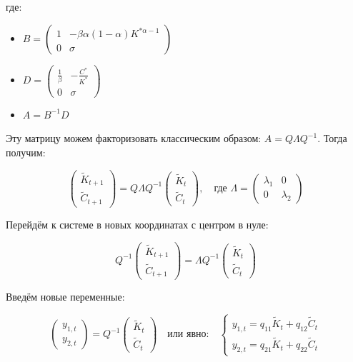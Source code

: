 \documentclass[a4paper,12pt]{article}
\begin{document}
{где:
\begin{itemize}
\item $B = \begin{pmatrix}
1 & -\beta \alpha (1-\alpha) K^{*\alpha-1} \\
0 & \sigma
\end{pmatrix}$ 
\item $D = \begin{pmatrix}
\frac{1}{\beta} & -\frac{C^*}{K^*} \\
0 & \sigma
\end{pmatrix}$ 
\item $A = B^{-1}D$
\end{itemize}


Эту матрицу можем факторизовать классическим образом: $A = Q \Lambda Q^{-1}$. Тогда получим:

\[
\begin{pmatrix}
\tilde{K}_{t+1} \\
\tilde{C}_{t+1}
\end{pmatrix} 
= Q \Lambda Q^{-1} 
\begin{pmatrix}
\tilde{K}_t \\
\tilde{C}_t
\end{pmatrix}, 
\quad \text{где } 
\Lambda = \begin{pmatrix}
\lambda_1 & 0 \\
0 & \lambda_2
\end{pmatrix}
\]

Перейдём к системе в новых координатах с центром в нуле:

\[
Q^{-1} \begin{pmatrix}
\tilde{K}_{t+1} \\
\tilde{C}_{t+1}
\end{pmatrix} 
= \Lambda Q^{-1} \begin{pmatrix}
\tilde{K}_t \\
\tilde{C}_t
\end{pmatrix}
\]

Введём новые переменные:

\[
\begin{pmatrix}
y_{1,t} \\
y_{2,t}
\end{pmatrix} 
= Q^{-1} \begin{pmatrix}
\tilde{K}_t \\
\tilde{C}_t
\end{pmatrix} 
\quad \text{или явно:}
\quad 
\begin{cases}
y_{1,t} = q_{11} \tilde{K}_t + q_{12} \tilde{C}_t \\
y_{2,t} = q_{21} \tilde{K}_t + q_{22} \tilde{C}_t
\end{cases}
\]

}
\end{document}

